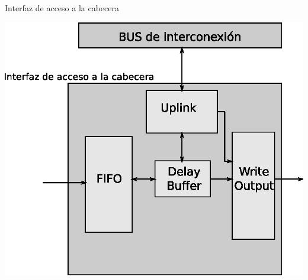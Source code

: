 \documentclass[xcolor=dvipsnames]{beamer}
\begin{document}
\begin{frame}{Interfaz de acceso a la cabecera}

\center 
\includegraphics[scale=0.60]{figures/modulo.eps}
\end{frame}
\end{document}
